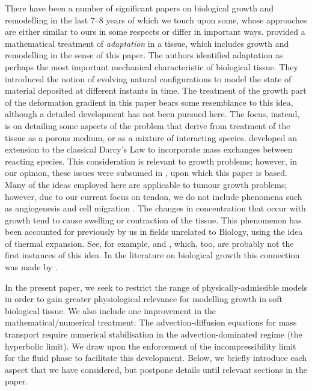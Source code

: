 There have been a number of significant papers on biological growth
and remodelling in the last 7--8 years of which we touch upon some,
whose approaches are either similar to ours in some respects or differ
in important ways. \citet{HumphreyRajagopal:02} provided a
mathematical treatment of \emph{adaptation} in a tissue, which includes 
growth and remodelling in the sense of this paper. The authors
identified adaptation as perhaps the most important mechanical
characteristic of biological tissue. They introduced the notion of evolving
natural configurations to model the state of material deposited at
different instants in time. The treatment of the growth part of the
deformation gradient in this paper bears some resemblance to this
idea, although a detailed development has not been pursued here. The
focus, instead, is on detailing some aspects of the problem that
derive from treatment of the tissue as a porous medium, or as a
mixture of interacting species. \citet{PreziosiFarina:2002} developed an
extension to the classical Darcy's Law to incorporate mass exchanges
between reacting species. This consideration is relevant to growth
problems; however, in our opinion, these issues were subsumed in
\citet{growthpaper}, upon which this paper is based. Many of the ideas
employed here are applicable to tumour growth problems; however, due
to our current focus on tendon, we do not include phenomena
such as angiogenesis and cell migration \citep[see for
  example][]{Brewardetal:2003}. The changes in concentration that
occur with growth tend to cause swelling or contraction of the
tissue. This phenomenon has been accounted for previously by us in fields unrelated to
Biology, using the idea of thermal expansion. See, for
example, \citet{Rao2:00} and \citet{Garikipatietal:01}, which, too,
are probably not the first instances of this idea. In the literature
on biological 
growth this connection was made by \citet{KlischHoger:2003}.

In the present paper, we seek to restrict the range of
physically-admissible models in order to gain greater
physiological relevance for modelling growth in soft biological
tissue. We also include one improvement in the mathematical/numerical treatment:
The advection-diffusion equations for mass transport
require numerical stabilisation in the advection-dominated regime
(the hyperbolic limit). We draw upon the enforcement of the
incompressibility limit for the fluid phase to facilitate this
development. Below, we briefly introduce each aspect that we have
considered, but postpone details until relevant sections in the paper.

